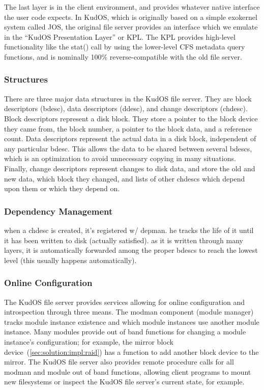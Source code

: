 The last layer is in the client environment, and provides whatever native
interface the user code expects. In KudOS, which is originally based on a simple
exokernel system called JOS, the original file server provides an interface
which we emulate in the ``KudOS Presentation Layer'' or KPL. The KPL provides
high-level functionality like the stat() call by using the lower-level CFS
metadata query functions, and is nominally 100\% reverse-compatible with the old
file server.

\subsubsection{Structures}

There are three major data structures in the KudOS file server. They are block
descriptors (bdesc), data descriptors (ddesc), and change descriptors (chdesc).
Block descriptors represent a disk block. They store a pointer to the block
device they came from, the block number, a pointer to the block data, and a
reference count. Data descriptors represent the actual data in a disk block,
independent of any particular bdesc. This allows the data to be shared between
several bdescs, which is an optimization to avoid unnecessary copying in many
situations. Finally, change descriptors represent changes to disk data, and
store the old and new data, which block they changed, and lists of other chdescs
which depend upon them or which they depend on.

\subsubsection{Dependency Management}

when a chdesc is created, it's registered w/ depman. he tracks the
life of it until it has been written to disk (actually satisfied). as
it is written through many layers, it is automatically forwarded
among the proper bdescs to reach the lowest level (this usually
happens automatically).

\subsubsection{Online Configuration}

The KudOS file server provides services allowing for online configuration
and introspection through three means. The modman component (module
manager) tracks module instance existence and which module instances use
another module instance. Many modules provide out of band functions for
changing a module instance's configuration; for example, the mirror block
device~(\ref{sec:solution:impl:raid}) has a function to add another block
device to the mirror. The KudOS file server also provides remote procedure
calls for all modman and module out of band functions, allowing client
programs to mount new filesystems or inspect the KudOS file server's
current state, for example.

